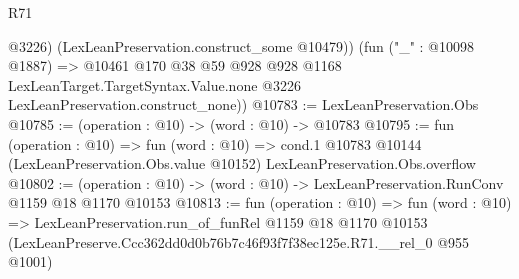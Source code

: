 \begin{lexlean}{R71}
\begin{coremodule}
          @3226)
        (LexLeanPreservation.construct_some @10479))
      (fun ("_" : @10098 @1887) =>
      @10461
        @170
        @38
        @59
        @928
        @928
        @1168
        LexLeanTarget.TargetSyntax.Value.none
        @3226
        LexLeanPreservation.construct_none))
@10783 := LexLeanPreservation.Obs
@10785 := (operation : @10) -> (word : @10) -> @10783
@10795 := fun (operation : @10) =>
  fun (word : @10) =>
  cond.{1} @10783 @10144 (LexLeanPreservation.Obs.value @10152) LexLeanPreservation.Obs.overflow
@10802 := (operation : @10) -> (word : @10) -> LexLeanPreservation.RunConv @1159 @18 @1170 @10153
@10813 := fun (operation : @10) =>
  fun (word : @10) =>
  LexLeanPreservation.run_of_funRel
    @1159
    @18
    @1170
    @10153
    (LexLeanPreserve.Ccc362dd0d0b76b7c46f93f7f38ec125e.R71.__rel_0 @955 @1001)
\end{coremodule}
\end{lexlean}
